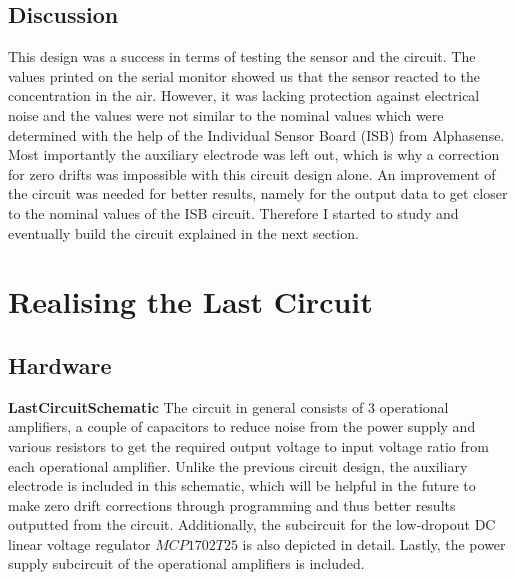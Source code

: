 \subsection{Discussion}
This design was a success in terms of testing the sensor and the circuit. The values printed on the serial monitor showed us that the sensor reacted to the  concentration in the air. However, it was lacking protection against electrical noise and the values were not similar to the nominal values which were determined with the help of the Individual Sensor Board (ISB) from Alphasense. Most importantly the auxiliary electrode was left out, which is why a correction for zero drifts was impossible with this circuit design alone. An improvement of the circuit was needed for better results, namely for the output data to get closer to the nominal values of the ISB circuit. Therefore I started to study and eventually build the circuit explained in the next section.  


\section{Realising the Last Circuit}
\subsection{Hardware}
\textbf{LastCircuitSchematic} The circuit in general consists of 3 operational amplifiers, a couple of capacitors to reduce noise from the power supply and various resistors to get the required output voltage to input voltage ratio from each operational amplifier. Unlike the previous circuit design, the auxiliary electrode is included in this schematic, which will be helpful in the future to make zero drift corrections through programming and thus better results outputted from the circuit. Additionally, the subcircuit for the low-dropout DC linear voltage regulator $MCP1702T25$ is also depicted in detail. Lastly, the power supply subcircuit of the operational amplifiers is included.

